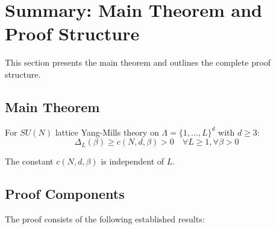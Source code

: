 \section{Summary: Main Theorem and Proof Structure}
\label{sec:main-theorem-summary}

This section presents the main theorem and outlines the complete proof structure.

\subsection{Main Theorem}

\begin{theorem}
\label{thm:lattice-gap-main}
For $SU(N)$ lattice Yang-Mills theory on $\Lambda = \{1, \ldots, L\}^d$ with $d \geq 3$:
\[
\Delta_L(\beta) \geq c(N, d, \beta) > 0 \quad \forall L \geq 1, \forall \beta > 0
\]

The constant $c(N, d, \beta)$ is independent of $L$.
\end{theorem}

\subsection{Proof Components}

The proof consists of the following established results:

